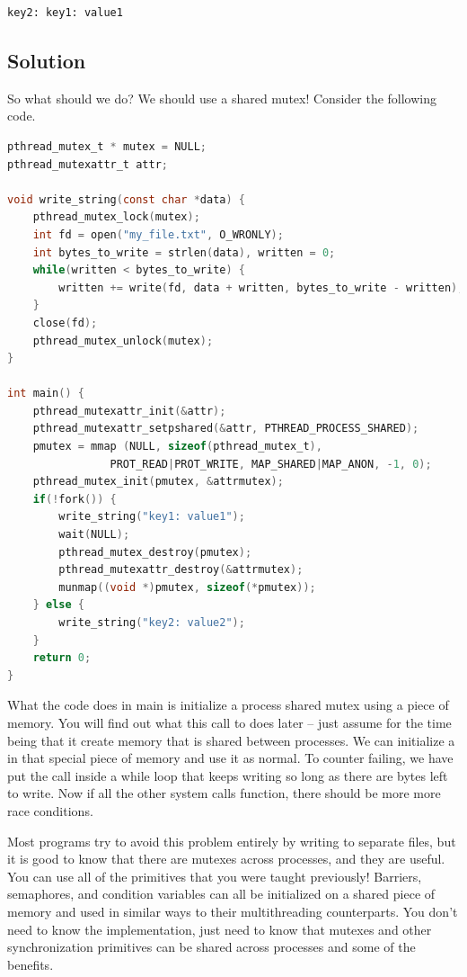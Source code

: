 \begin{lstlisting}
key2: key1: value1
\end{lstlisting}

\subsection{Solution}\label{solution}

So what should we do? We should use a shared mutex! Consider the following code.

\begin{lstlisting}[language=C]
pthread_mutex_t * mutex = NULL;
pthread_mutexattr_t attr;

void write_string(const char *data) {
    pthread_mutex_lock(mutex);
    int fd = open("my_file.txt", O_WRONLY);
    int bytes_to_write = strlen(data), written = 0;
    while(written < bytes_to_write) {
        written += write(fd, data + written, bytes_to_write - written);
    }
    close(fd);
    pthread_mutex_unlock(mutex);
}

int main() {
    pthread_mutexattr_init(&attr);
    pthread_mutexattr_setpshared(&attr, PTHREAD_PROCESS_SHARED);
    pmutex = mmap (NULL, sizeof(pthread_mutex_t), 
                PROT_READ|PROT_WRITE, MAP_SHARED|MAP_ANON, -1, 0);
    pthread_mutex_init(pmutex, &attrmutex);
    if(!fork()) {
        write_string("key1: value1");
        wait(NULL);
        pthread_mutex_destroy(pmutex);
        pthread_mutexattr_destroy(&attrmutex); 
        munmap((void *)pmutex, sizeof(*pmutex));
    } else {
        write_string("key2: value2");
    }
    return 0;
}
\end{lstlisting}

What the code does in main is initialize a process shared mutex using a piece of  memory. You will find out what this call to  does later -- just assume for the time being that it create memory that is shared between processes. We can initialize a  in that special piece of memory and use it as normal. To counter  failing, we have put the  call inside a while loop that keeps writing so long as there are bytes left to write. Now if all the other system calls function, there should be more more race conditions.

Most programs try to avoid this problem entirely by writing to separate files, but it is good to know that there are mutexes across processes, and they are useful. You can use all of the primitives that you were taught previously! Barriers, semaphores, and condition variables can all be initialized on a shared piece of memory and used in similar ways to their multithreading counterparts. You don't need to know the implementation, just need to know that mutexes and other synchronization primitives can be shared across processes and some of the benefits.


